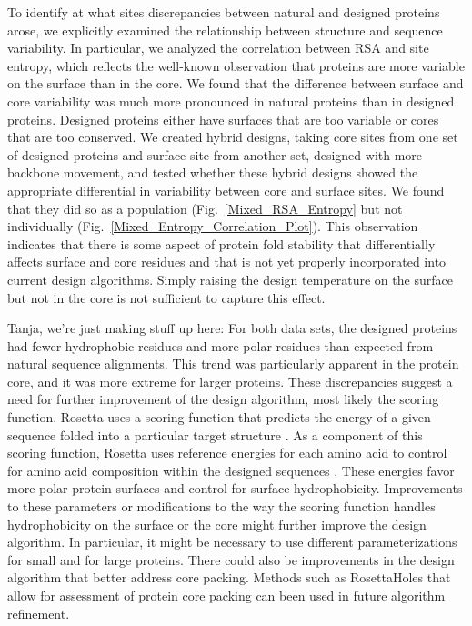 \documentclass[12pt]{article}
\begin{document}
To identify at what sites discrepancies between natural and designed proteins arose, we explicitly examined the relationship between structure and sequence variability. In particular, we analyzed the correlation between RSA and site entropy, which reflects the well-known observation that proteins are more variable on the surface than in the core. We found that the difference between surface and core variability was much more pronounced in natural proteins than in designed proteins. Designed proteins either have surfaces that are too variable or cores that are too conserved. We created hybrid designs, taking core sites from one set of designed proteins and surface site from another set, designed with more backbone movement, and tested whether these hybrid designs showed the appropriate differential in variability between core and surface sites. We found that they did so as a population (Fig.~\ref{Mixed_RSA_Entropy} but not individually (Fig.~\ref{Mixed_Entropy_Correlation_Plot}). This observation indicates that there is some aspect of protein fold stability that differentially affects surface and core residues and that is not yet properly incorporated into current design algorithms. Simply raising the design temperature on the surface but not in the core is not sufficient to capture this effect.

{\color{green}Tanja, we're just making stuff up here:} For both data sets, the designed proteins had fewer hydrophobic residues and more polar residues than expected from natural sequence alignments. This trend was particularly apparent in the protein core, and it was more extreme for larger proteins. These discrepancies suggest a need for further improvement of the design algorithm, most likely the scoring function. Rosetta uses a scoring function that predicts the energy of a given sequence folded into a particular target structure \citep{Das2008}. As a component of this scoring function, Rosetta uses reference energies for each amino acid to control for amino acid composition within the designed sequences \citep{Jacak2012}. These energies favor more polar protein surfaces and control for surface hydrophobicity. Improvements to these parameters or modifications to the way the scoring function handles hydrophobicity on the surface or the core might further improve the design algorithm. In particular, it might be necessary to use different parameterizations for small and for large proteins. There could also be improvements in the design algorithm that better address core packing. Methods such as RosettaHoles \citep{Sheffler2009} that allow for assessment of protein core packing can been used in future algorithm refinement.
\end{document}

